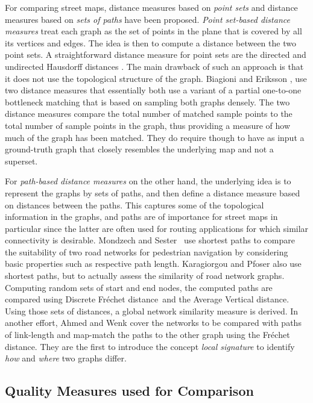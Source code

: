 \documentclass[natbib]{svjour3}                    \smartqed  \usepackage[table]{xcolor}
\newcommand{\Frd}{Fr\'echet distance}
\begin{document}
For comparing street maps, distance measures based on \emph{point sets} and distance measures based on \emph{sets of paths} have been proposed. 
\emph{Point set-based distance measures} treat each graph as the set of points in the plane that is covered by all its vertices and edges. The idea is then to compute a distance between the two point sets. A straightforward distance measure for point sets are the directed and undirected Hausdorff distances \cite{ag-dgsmi-99}. The main drawback of such an approach is that it does not use the topological structure of the graph. Biagioni and Eriksson \cite{be-irmgp-12,Liu:2012:MLS:2339530.2339637}, use two distance measures that essentially both use a variant of a partial one-to-one bottleneck matching that is based on sampling both graphs densely.
The two distance measures compare the total number of matched sample points to the total number of sample points in the graph, thus providing a measure of how much of the graph has been matched. They do require though to have as input a ground-truth graph that closely resembles the underlying map and not a superset.

For \emph{path-based distance measures} on the other hand, the underlying idea is to represent the graphs by sets of paths, and then define a distance measure based on distances between the paths. This captures some of the topological information in the graphs, and paths are of importance for street maps in particular since the latter are often used for routing applications for which similar connectivity is desirable. 
Mondzech and Sester~\cite{MondzechS11} use shortest paths to compare the suitability of two road networks for pedestrian navigation by considering basic properties such as respective path length. 
Karagiorgou and Pfoser \cite{Karagiorgou:2012:VTD:2424321.2424334} also use shortest paths, but to actually assess the similarity of road network graphs. Computing random sets of start and end nodes, the computed paths are compared using Discrete \Frd\ and the Average Vertical distance. Using those sets of distances, a global network similarity measure is derived.
In another effort, Ahmed and Wenk \cite{aw-SIGSPATIAL-13} cover the networks to be compared with paths of  link-length and map-match the paths to the other graph using the \Frd. They are the first to introduce the concept {\em local signature} to identify {\em how} and {\em where} two graphs differ.  

\subsection{Quality Measures used for Comparison}
\label{subsec:subsec_qmu}
\end{document}
